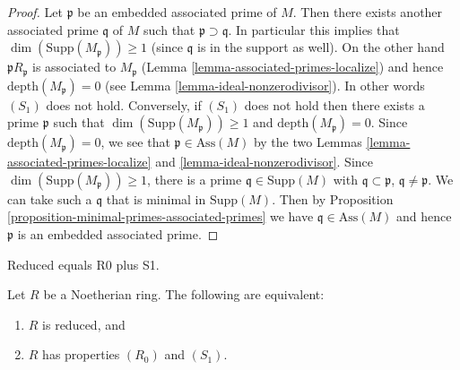 \begin{proof}
Let $\mathfrak p$ be an embedded associated prime of $M$.
Then there exists another associated prime $\mathfrak q$ of $M$
such that $\mathfrak p \supset \mathfrak q$. In particular this
implies that $\dim(\text{Supp}(M_{\mathfrak p})) \geq 1$ (since $\mathfrak q$
is in the support as well). On the other hand $\mathfrak pR_{\mathfrak p}$
is associated to $M_{\mathfrak p}$
(Lemma \ref{lemma-associated-primes-localize}) and hence
$\text{depth}(M_{\mathfrak p}) = 0$
(see Lemma \ref{lemma-ideal-nonzerodivisor}).
In other words $(S_1)$ does not hold.
Conversely, if $(S_1)$ does not hold then there exists a prime
$\mathfrak p$ such that $\dim(\text{Supp}(M_{\mathfrak p})) \geq 1$
and $\text{depth}(M_{\mathfrak p}) = 0$. Since
$\text{depth}(M_{\mathfrak p}) = 0$, we see that
$\mathfrak p \in \text{Ass}(M)$ by the two Lemmas
\ref{lemma-associated-primes-localize} and \ref{lemma-ideal-nonzerodivisor}.
Since $\dim(\text{Supp}(M_{\mathfrak p})) \geq 1$, there
is a prime $\mathfrak q \in \text{Supp}(M)$ with
$\mathfrak q \subset \mathfrak p$, $\mathfrak q \not = \mathfrak p$.
We can take such a $\mathfrak q$ that is minimal in
$\text{Supp}(M)$. Then by
Proposition \ref{proposition-minimal-primes-associated-primes}
we have $\mathfrak q \in \text{Ass}(M)$ and hence
$\mathfrak p$ is an embedded associated prime.
\end{proof}

\begin{lemma}
\label{lemma-criterion-reduced}
\begin{slogan}
Reduced equals R0 plus S1.
\end{slogan}
Let $R$ be a Noetherian ring.
The following are equivalent:
\begin{enumerate}
\item $R$ is reduced, and
\item $R$ has properties $(R_0)$ and $(S_1)$.
\end{enumerate}
\end{lemma}

